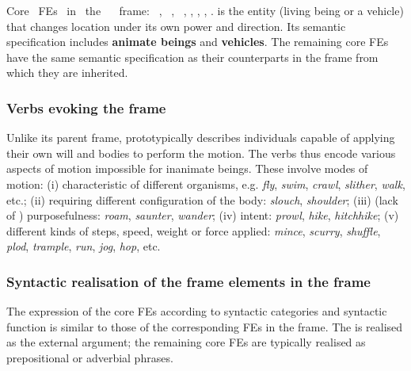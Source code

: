 \documentclass[output=paper,colorlinks,citecolor=brown]{langscibook}
\begin{document}
Core~ FEs~ in~ the~ ~ frame:~ ,~ ,~ , , , , .
 is the entity (living being or a vehicle) that changes location under its own power and direction. Its semantic specification includes \textbf{animate beings} and \textbf{vehicles}. The remaining core FEs have the same semantic specification as their counterparts in the  frame from which they are inherited. 



\subsubsection{Verbs evoking the  frame}

Unlike its parent frame,  prototypically describes individuals capable of applying their own will and bodies to perform the motion. The verbs thus encode various aspects of motion impossible for inanimate beings. These involve modes of motion: (i) characteristic of different organisms, e.g. \textit{fly}, \textit{swim}, \textit{crawl}, \textit{slither}, \textit{walk}, etc.; (ii) requiring different configuration of the body: \textit{slouch}, \textit{shoulder}; (iii) (lack of ) purposefulness: \textit{roam}, \textit{saunter}, \textit{wander}; (iv) intent: \textit{prowl}, \textit{hike}, \textit{hitchhike}; (v) different kinds of steps, speed, weight or force applied: \textit{mince}, \textit{scurry}, \textit{shuffle}, \textit{plod}, \textit{trample}, \textit{run}, \textit{jog}, \textit{hop}, etc. 

\subsubsection{Syntactic realisation of the frame elements in the  frame}

The expression of the core FEs according to syntactic categories and syntactic function is similar to those of the corresponding FEs in the  frame. The  is realised as the external argument; the remaining core FEs are typically realised as prepositional or adverbial phrases. %
\end{document}
